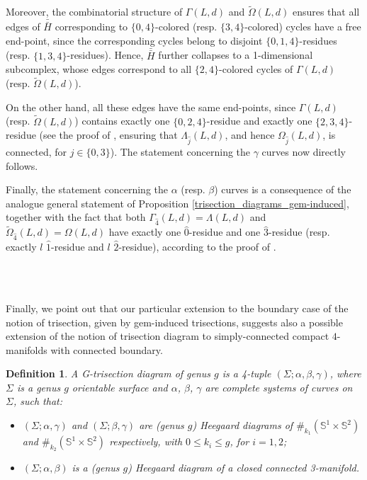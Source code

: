 \documentclass[12pt,a4paper]{article}
\newtheorem{definition}{Definition}
\newcommand{\qed}{\\ \rightline{$\Box$ \ \ \ \ \ \ \ \ \ \ \ \ \ \ \ }\\}
\begin{document}
Moreover, the combinatorial structure of $\Gamma(L,d)$ and  $\tilde \Omega(L,d)$ ensures that all edges of $\bar{\bar H}$ corresponding to $\{0,4\}$-colored (resp. $\{3,4\}$-colored) cycles have a free end-point, since the corresponding cycles belong to disjoint $\{0,1,4\}$-residues (resp. $\{1,3,4\}$-residues). Hence, $\bar{\bar H}$ further collapses to a 1-dimensional subcomplex, whose edges correspond to all $\{2,4\}$-colored cycles of $\Gamma(L,d)$ (resp.  $\tilde \Omega(L,d)$).       

On the other hand, all these edges have the same end-points, since  $\Gamma(L,d)$ (resp.  $\tilde \Omega(L,d)$) contains exactly one $\{0,2,4\}$-residue and exactly one $\{2,3,4\}$-residue (see the proof of \cite[Theorem 2]{Casali JKTR2000}, ensuring that $\Lambda_{\hat j}(L,d)$, and hence $\Omega_{\hat j}(L,d)$, is connected, for $j \in \{0,3\}$). 
The statement concerning the $\gamma$ curves now directly follows.

Finally, the statement concerning the $\alpha$ (resp. $\beta$) curves is a consequence of the analogue general statement of Proposition \ref{trisection_diagrams_gem-induced}, together with the fact that both $\Gamma_{\hat 4}(L,d)=\Lambda(L,d)$ and $\tilde \Omega_{\hat 4}(L,d)=\Omega(L,d)$ have exactly one $\hat 0$-residue and one $\hat 3$-residue  (resp. exactly $l$ $\hat 1$-residue and $l$ $\hat 2$-residue), according to the proof of \cite[Theorem 2]{Casali JKTR2000}.  

\ \qed

\bigskip

Finally, we point out that our particular extension to the boundary case of the notion of trisection, given by gem-induced trisections, suggests also a possible extension of the notion of trisection diagram to simply-connected compact $4$-manifolds with connected boundary. 

\begin{definition}
{\em A {\it G-trisection diagram}  of genus $g$ is a 4-tuple $(\Sigma; \alpha, \beta, \gamma)$, where $\Sigma$ is a genus $g$ orientable surface and $\alpha$, $\beta$, $\gamma$ are complete systems of curves on $\Sigma$, such that: 
\begin{itemize}
    \item[-] 
  $(\Sigma; \alpha, \gamma)$ and $(\Sigma; \beta, \gamma)$ are (genus $g$) Heegaard diagrams of $\#_{k_1}(\mathbb S^1 \times \mathbb S^2)$ and $\#_{k_2}(\mathbb S^1 \times \mathbb S^2)$ respectively, with $0\le k_i \le g$, for $i=1,2$;
  \item[-] 
 $(\Sigma; \alpha, \beta)$ is a (genus $g$) Heegaard diagram of a closed connected 3-manifold.  
\end{itemize} 

 }
\end{definition}
\end{document}
